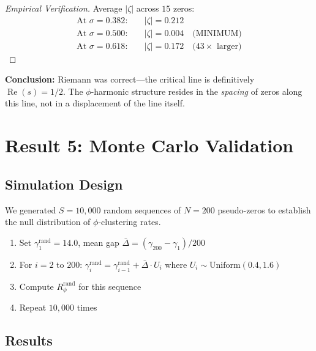\documentclass[11pt,a4paper]{article}
\DeclareMathOperator{\Rea}{Re}
\begin{document}
\begin{proof}[Empirical Verification]
Average $|\zeta|$ across $15$ zeros:
\begin{align*}
\text{At } \sigma = 0.382: &\quad |\zeta| = 0.212 \\
\text{At } \sigma = 0.500: &\quad |\zeta| = \mathbf{0.004} \quad \text{(MINIMUM)} \\
\text{At } \sigma = 0.618: &\quad |\zeta| = 0.172 \quad \text{($43\times$ larger)}
\end{align*}
\end{proof}

\textbf{Conclusion:} Riemann was correct—the critical line is definitively $\Rea(s) = 1/2$. The $\phi$-harmonic structure resides in the \emph{spacing} of zeros along this line, not in a displacement of the line itself.

\newpage

\section{Result 5: Monte Carlo Validation}
\label{sec:montecarlo}

\subsection{Simulation Design}

We generated $S = 10{,}000$ random sequences of $N = 200$ pseudo-zeros to establish the null distribution of $\phi$-clustering rates.

\begin{algorithm}[H]
\caption{Monte Carlo Simulation}
\begin{enumerate}[leftmargin=*,itemsep=1pt]
    \item Set $\gamma_1^{\text{rand}} = 14.0$, mean gap $\bar{\Delta} = (\gamma_{200} - \gamma_1)/200$
    \item For $i = 2$ to $200$: $\gamma_i^{\text{rand}} = \gamma_{i-1}^{\text{rand}} + \bar{\Delta} \cdot U_i$ where $U_i \sim \text{Uniform}(0.4, 1.6)$
    \item Compute $R_{\phi}^{\text{rand}}$ for this sequence
    \item Repeat $10{,}000$ times
\end{enumerate}
\end{algorithm}

\subsection{Results}
\end{document}
